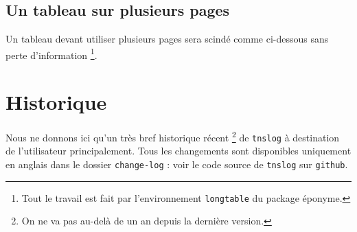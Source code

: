 \documentclass[12pt,a4paper]{article}
\theoremstyle{definition}
\newcommand\env[1]{\texttt{#1}}
\begin{document}


\subsection{Un tableau sur plusieurs pages}

Un tableau devant utiliser plusieurs pages sera scindé comme ci-dessous sans perte d'information
\footnote{
	Tout le travail est fait par l'environnement \env{longtable} du package éponyme.
}.

\begin{figure}[hbt!]
	\centering
\end{figure}
\newpage

\section{Historique}

Nous ne donnons ici qu'un très bref historique récent
\footnote{
	On ne va pas au-delà de un an depuis la dernière version.
}
de \verb+tnslog+ à destination de l'utilisateur principalement.
Tous les changements sont disponibles uniquement en anglais dans le dossier \verb+change-log+ : voir le code source de \verb+tnslog+ sur \verb+github+.
\end{document}
